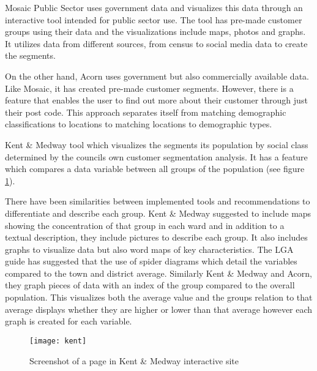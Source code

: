 Mosaic Public Sector uses government data and visualizes this data through an interactive tool intended for public sector use. The tool has pre-made customer groups using their data and the visualizations include maps, photos and graphs. It utilizes data from different sources, from census to social media data to create the segments. \par

On the other hand, Acorn uses government but also commercially available data. Like Mosaic, it has created pre-made customer segments. However, there is a feature that enables the user to find out more about their customer through just their post code. This approach separates itself from matching demographic classifications to locations to matching locations to demographic types. \par

Kent \& Medway tool which visualizes the segments its population by social class determined by the council\textsc{}s own customer segmentation analysis. It has a feature which compares a data variable between all groups of the population (see figure \ref{fig:kent}).\par

There have been similarities between implemented tools and recommendations to differentiate and describe each group. Kent \& Medway suggested to include maps showing the concentration of that group in each ward and in addition to a textual description, they include pictures to describe each group. It also includes graphs to visualize data but also word maps of key characteristics. The LGA guide \cite{lgaguide} has suggested that the use of spider diagrams which detail the variables compared to the town and district average. Similarly Kent \& Medway and Acorn, they graph pieces of data with an index of the group compared to the overall population. This visualizes both the average value and the groups relation to that average displays whether they are higher or lower than that average however each graph is created for each variable.


\begin{figure}[h]
\centering
\texttt{[image: kent]}
\caption{Screenshot of a page in Kent \& Medway interactive site}
\label{fig:kent}
\end{figure}